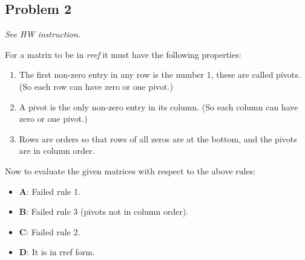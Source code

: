 \documentclass[11pt]{article}
\begin{document}
\subsection*{Problem 2}
\textit{See HW instruction.}\newline

For a matrix to be in \textit{rref} it must have the following properties:

\begin{enumerate}
    \item The first non-zero entry in any row is the number 1, these are called pivots. (So each row can have zero or one pivot.)
    \item A pivot is the only non-zero entry in its column. (So each column can have zero or one pivot.)
    \item Rows are orders so that rows of all zeros are at the bottom, and the pivots are in column order.
\end{enumerate}

Now to evaluate the given matrices with respect to the above rules:

\begin{itemize}
    \item \textbf{A}: Failed rule 1.
    \item \textbf{B}: Failed rule 3 (pivots not in column order).
    \item \textbf{C}: Failed rule 2.
    \item \textbf{D}: It is in rref form.
\end{itemize}
\end{document}

